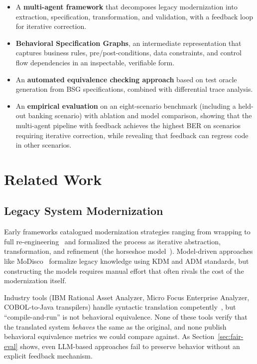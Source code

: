 \documentclass[conference]{IEEEtran}
\begin{document}
\begin{itemize}
    \item A \textbf{multi-agent framework} that decomposes legacy modernization into extraction, specification, transformation, and validation, with a feedback loop for iterative correction.
    \item \textbf{Behavioral Specification Graphs}, an intermediate representation that captures business rules, pre/post-conditions, data constraints, and control flow dependencies in an inspectable, verifiable form.
    \item An \textbf{automated equivalence checking approach} based on test oracle generation from BSG specifications, combined with differential trace analysis.
    \item An \textbf{empirical evaluation} on an eight-scenario benchmark (including a held-out banking scenario) with ablation and model comparison, showing that the multi-agent pipeline with feedback achieves the highest BER on scenarios requiring iterative correction, while revealing that feedback can regress code in other scenarios.
\end{itemize}

\section{Related Work}

\subsection{Legacy System Modernization}

Early frameworks catalogued modernization strategies ranging from wrapping to full re-engineering~\cite{comella2000survey} and formalized the process as iterative abstraction, transformation, and refinement (the horseshoe model~\cite{kazman1998requirements}). Model-driven approaches like MoDisco~\cite{bruneliere2014modisco} formalize legacy knowledge using KDM and ADM standards, but constructing the models requires manual effort that often rivals the cost of the modernization itself.

Industry tools (IBM Rational Asset Analyzer, Micro Focus Enterprise Analyzer, COBOL-to-Java transpilers) handle syntactic translation competently~\cite{delucia2001cobol}, but ``compile-and-run'' is not behavioral equivalence. None of these tools verify that the translated system \textit{behaves} the same as the original, and none publish behavioral equivalence metrics we could compare against. As Section~\ref{sec:fair-eval} shows, even LLM-based approaches fail to preserve behavior without an explicit feedback mechanism.
\end{document}

